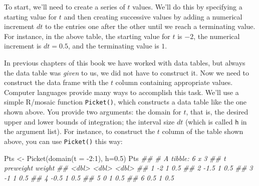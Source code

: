 \documentclass[
  letterpaper,
  DIV=11,
  numbers=noendperiod,
  oneside]{scrreprt}
\newenvironment{Shaded}{\begin{snugshade}}{\end{snugshade}}
\newcommand{\AttributeTok}[1]{\textcolor[rgb]{0.40,0.46,0.14}{#1}}
\newcommand{\DecValTok}[1]{\textcolor[rgb]{0.68,0.00,0.00}{#1}}
\newcommand{\DocumentationTok}[1]{\textcolor[rgb]{0.37,0.37,0.37}{\textit{#1}}}
\newcommand{\FloatTok}[1]{\textcolor[rgb]{0.68,0.00,0.00}{#1}}
\newcommand{\FunctionTok}[1]{\textcolor[rgb]{0.28,0.35,0.67}{#1}}
\newcommand{\NormalTok}[1]{\textcolor[rgb]{0.00,0.46,0.62}{#1}}
\newcommand{\OtherTok}[1]{\textcolor[rgb]{0.00,0.46,0.62}{#1}}
\newcommand{\SpecialCharTok}[1]{\textcolor[rgb]{0.37,0.37,0.37}{#1}}
\begin{document}

To start, we'll need to create a series of \(t\) values. We'll do this
by specifying a starting value for \(t\) and then creating successive
values by adding a numerical increment \(dt\) to the entries one after
the other until we reach a terminating value. For instance, in the above
table, the starting value for \(t\) is \(-2\), the numerical increment
is \(dt=0.5\), and the terminating value is \(1\).

In previous chapters of this book we have worked with data tables, but
always the data table was \emph{given} to us, we did not have to
construct it. Now we need to construct the data frame with the \(t\)
column containing appropriate values. Computer languages provide many
ways to accomplish this task. We'll use a simple R/mosaic function
\texttt{Picket()}, which constructs a data table like the one shown
above. You provide two arguments: the domain for \(t\), that is, the
desired upper and lower bounds of integration; the interval size \(dt\)
(which is called \texttt{h} in the argument list). For instance, to
construct the \(t\) column of the table shown above, you can use
\texttt{Picket()} this way:

\begin{Shaded}
\begin{Highlighting}[]
\NormalTok{Pts }\OtherTok{\textless{}{-}} \FunctionTok{Picket}\NormalTok{(}\FunctionTok{domain}\NormalTok{(}\AttributeTok{t =} \SpecialCharTok{{-}}\DecValTok{2}\SpecialCharTok{:}\DecValTok{1}\NormalTok{), }\AttributeTok{h=}\FloatTok{0.5}\NormalTok{)}
\NormalTok{Pts}
\DocumentationTok{\#\# \# A tibble: 6 x 3}
\DocumentationTok{\#\#       t preweight weight}
\DocumentationTok{\#\#   \textless{}dbl\textgreater{}     \textless{}dbl\textgreater{}  \textless{}dbl\textgreater{}}
\DocumentationTok{\#\# 1  {-}2           1    0.5}
\DocumentationTok{\#\# 2  {-}1.5         1    0.5}
\DocumentationTok{\#\# 3  {-}1           1    0.5}
\DocumentationTok{\#\# 4  {-}0.5         1    0.5}
\DocumentationTok{\#\# 5   0           1    0.5}
\DocumentationTok{\#\# 6   0.5         1    0.5}
\end{Highlighting}
\end{Shaded}
\end{document}
